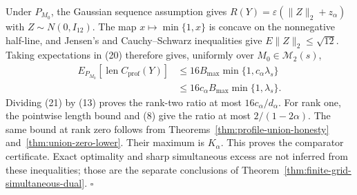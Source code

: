 Under \(P_{M_0}\), the Gaussian sequence assumption gives \(R(Y)=\varepsilon(\lVert Z\rVert_2+z_\alpha)\) with \(Z\sim N(0,I_{12})\).  The map \(x\mapsto\min\{1,x\}\) is concave on the nonnegative half-line, and Jensen's and Cauchy--Schwarz inequalities give \(E\lVert Z\rVert_2\leq\sqrt{12}\).  Taking expectations in (20) therefore gives, uniformly over \(M_0\in\mathcal M_2(s)\),
\[
 \begin{split}
 E_{P_{M_0}}[\operatorname{len}C_{\mathrm{prof}}(Y)]
 &\leq16B_{\max}\min\{1,c_\alpha\lambda_s\}\\
 &\leq16c_\alpha B_{\max}\min\{1,\lambda_s\}.
 \end{split}
\tag{21}
\]
Dividing (21) by (13) proves the rank-two ratio at most \(16c_\alpha/d_\alpha\).  For rank one, the pointwise length bound and (8) give the ratio at most \(2/(1-2\alpha)\).  The same bound at rank zero follows from Theorems~\ref{thm:profile-union-honesty} and~\ref{thm:union-zero-lower}.  Their maximum is \(K_\alpha\).  This proves the comparator certificate.  Exact optimality and sharp simultaneous excess are not inferred from these inequalities; those are the separate conclusions of Theorem~\ref{thm:finite-grid-simultaneous-dual}. \(\square\)